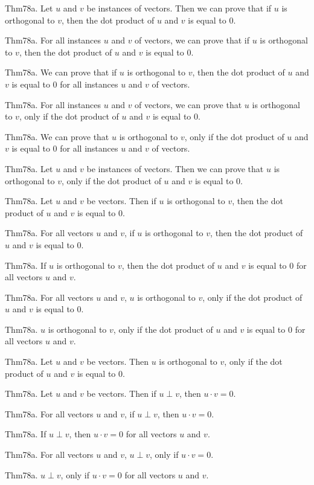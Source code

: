 \documentclass{article}
\begin{document}
Thm78a. Let $u$ and $v$ be instances of vectors. Then we can prove that if $u$ is orthogonal to $v$, then the dot product of $u$ and $v$ is equal to $0$.

Thm78a. For all instances $u$ and $v$ of vectors, we can prove that if $u$ is orthogonal to $v$, then the dot product of $u$ and $v$ is equal to $0$.

Thm78a. We can prove that if $u$ is orthogonal to $v$, then the dot product of $u$ and $v$ is equal to $0$ for all instances $u$ and $v$ of vectors.

Thm78a. For all instances $u$ and $v$ of vectors, we can prove that $u$ is orthogonal to $v$, only if the dot product of $u$ and $v$ is equal to $0$.

Thm78a. We can prove that $u$ is orthogonal to $v$, only if the dot product of $u$ and $v$ is equal to $0$ for all instances $u$ and $v$ of vectors.

Thm78a. Let $u$ and $v$ be instances of vectors. Then we can prove that $u$ is orthogonal to $v$, only if the dot product of $u$ and $v$ is equal to $0$.

Thm78a. Let $u$ and $v$ be vectors. Then if $u$ is orthogonal to $v$, then the dot product of $u$ and $v$ is equal to $0$.

Thm78a. For all vectors $u$ and $v$, if $u$ is orthogonal to $v$, then the dot product of $u$ and $v$ is equal to $0$.

Thm78a. If $u$ is orthogonal to $v$, then the dot product of $u$ and $v$ is equal to $0$ for all vectors $u$ and $v$.

Thm78a. For all vectors $u$ and $v$, $u$ is orthogonal to $v$, only if the dot product of $u$ and $v$ is equal to $0$.

Thm78a. $u$ is orthogonal to $v$, only if the dot product of $u$ and $v$ is equal to $0$ for all vectors $u$ and $v$.

Thm78a. Let $u$ and $v$ be vectors. Then $u$ is orthogonal to $v$, only if the dot product of $u$ and $v$ is equal to $0$.

Thm78a. Let $u$ and $v$ be vectors. Then if $u \perp v$, then $u \cdot v = 0$.

Thm78a. For all vectors $u$ and $v$, if $u \perp v$, then $u \cdot v = 0$.

Thm78a. If $u \perp v$, then $u \cdot v = 0$ for all vectors $u$ and $v$.

Thm78a. For all vectors $u$ and $v$, $u \perp v$, only if $u \cdot v = 0$.

Thm78a. $u \perp v$, only if $u \cdot v = 0$ for all vectors $u$ and $v$.
\end{document}

